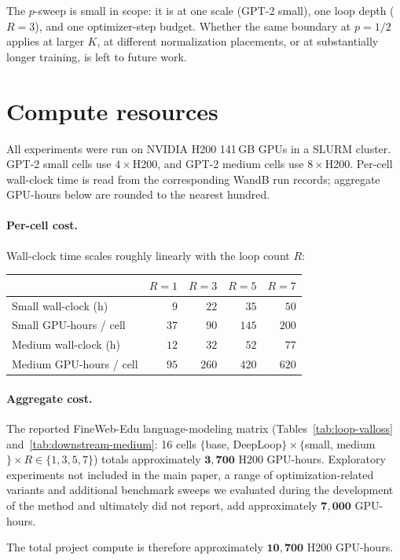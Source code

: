 \documentclass[11pt]{airesearch}
\begin{document}
The $p$-sweep is small in scope: it is at one scale (GPT-2 small), one
loop depth ($R{=}3$), and one optimizer-step budget. Whether the same
boundary at $p{=}1/2$ applies at larger $K$, at different normalization
placements, or at substantially longer training, is left to future work.

\clearpage

\section{Compute resources}
\label{app:compute}

All experiments were run on NVIDIA H200 141\,GB GPUs in a SLURM cluster.
GPT-2 small cells use $4\times$H200, and GPT-2 medium cells
use $8\times$H200. Per-cell wall-clock time is read from the corresponding
WandB run records; aggregate GPU-hours below are rounded to the nearest
hundred.

\paragraph{Per-cell cost.} Wall-clock time scales roughly linearly with
the loop count $R$:

\begin{center}
\small
\begin{tabular}{lrrrr}
  \toprule
  & $R{=}1$ & $R{=}3$ & $R{=}5$ & $R{=}7$ \\
  \midrule
  Small wall-clock (h)    & $9$  & $22$  & $35$  & $50$  \\
  Small GPU-hours / cell  & $37$ & $90$  & $145$ & $200$ \\
  \midrule
  Medium wall-clock (h)   & $12$ & $32$  & $52$  & $77$  \\
  Medium GPU-hours / cell & $95$ & $260$ & $420$ & $620$ \\
  \bottomrule
\end{tabular}
\end{center}

\paragraph{Aggregate cost.} The reported FineWeb-Edu language-modeling
matrix (Tables~\ref{tab:loop-valloss} and~\ref{tab:downstream-medium}: 16
cells $\{$base, DeepLoop$\}\times\{$small, medium$\}\times R\in\{1,3,5,7\}$)
totals approximately $\mathbf{3{,}700}$ H200 GPU-hours. Exploratory
experiments not included in the main paper, a range of
optimization-related variants and additional benchmark sweeps we
evaluated during the development of the method and ultimately did not
report, add approximately $\mathbf{7{,}000}$ GPU-hours.

The total project compute is therefore approximately $\mathbf{10{,}700}$
H200 GPU-hours.
\end{document}
